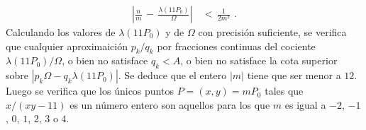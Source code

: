 \begin{align*}
\left| \frac{n}{m}\,-\,\frac{\lambda(11P_{0})}{\Omega} \right|
&\,<\,\frac{1}{2m^{2}}\text{ .}
\end{align*}
Calculando los valores de $\lambda(11P_{0})$ y de $\Omega$ con
precisi\'{o}n suficiente, se verifica que cualquier aproximaici\'{o}n
$p_{k}/q_{k}$ por fracciones continuas del cociente
$\lambda(11P_{0})/\Omega$, o bien no satisface $q_{k}<A$, o bien no
satisface la cota superior sobre
$|p_{k}\Omega-q_{k}\lambda(11P_{0})|$.
Se deduce que el entero $|m|$ tiene que ser menor a $12$. Luego
se verifica que los \'{u}nicos puntos $P=(x,y)=mP_{0}$ tales que
$x/(xy-11)$ es un n\'{u}mero entero son aquellos para los que
$m$ es igual a $-2$, $-1$, $0$, $1$, $2$, $3$ o $4$.
